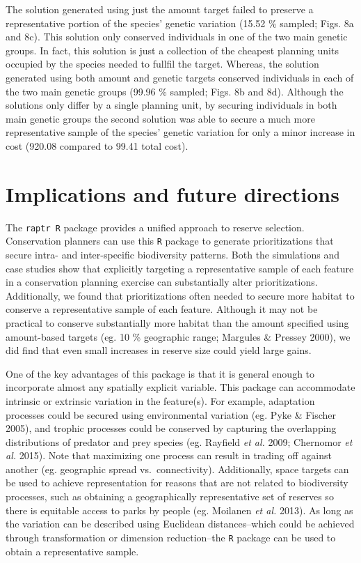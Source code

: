 The solution generated using just the amount target failed to preserve a
representative portion of the species' genetic variation (15.52 \%
sampled; Figs. 8a and 8c). This solution only conserved individuals in
one of the two main genetic groups. In fact, this solution is just a
collection of the cheapest planning units occupied by the species needed
to fullfil the target. Whereas, the solution generated using both amount
and genetic targets conserved individuals in each of the two main
genetic groups (99.96 \% sampled; Figs. 8b and 8d). Although the
solutions only differ by a single planning unit, by securing individuals
in both main genetic groups the second solution was able to secure a
much more representative sample of the species' genetic variation for
only a minor increase in cost (920.08 compared to 99.41 total cost).

\section{Implications and future
directions}\label{implications-and-future-directions}

The \texttt{raptr R} package provides a unified approach to reserve
selection. Conservation planners can use this \texttt{R} package to
generate prioritizations that secure intra- and inter-specific
biodiversity patterns. Both the simulations and case studies show that
explicitly targeting a representative sample of each feature in a
conservation planning exercise can substantially alter prioritizations.
Additionally, we found that prioritizations often needed to secure more
habitat to conserve a representative sample of each feature. Although it
may not be practical to conserve substantially more habitat than the
amount specified using amount-based targets (eg. 10 \% geographic range;
Margules \& Pressey 2000), we did find that even small increases in
reserve size could yield large gains.

One of the key advantages of this package is that it is general enough
to incorporate almost any spatially explicit variable. This package can
accommodate intrinsic or extrinsic variation in the feature(s). For
example, adaptation processes could be secured using environmental
variation (eg. Pyke \& Fischer 2005), and trophic processes could be
conserved by capturing the overlapping distributions of predator and
prey species (eg. Rayfield \emph{et al.} 2009; Chernomor \emph{et al.}
2015). Note that maximizing one process can result in trading off
against another (eg. geographic spread vs.~connectivity). Additionally,
space targets can be used to achieve representation for reasons that are
not related to biodiversity processes, such as obtaining a
geographically representative set of reserves so there is equitable
access to parks by people (eg. Moilanen \emph{et al.} 2013). As long as
the variation can be described using Euclidean distances--which could be
achieved through transformation or dimension reduction--the \texttt{R}
package can be used to obtain a representative sample.

